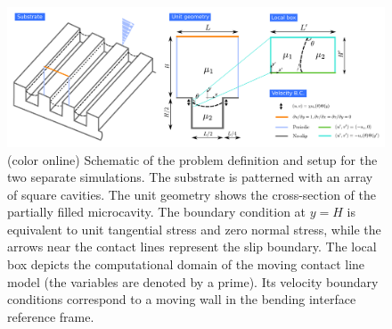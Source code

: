 \begin{figure}[t]
 \begin{center}
 \includegraphics[width=\columnwidth]{schematic5.pdf}
 \end{center}
 \caption{(color online) Schematic of the problem definition and setup for the two separate simulations. The substrate is patterned with an array of square cavities. The unit geometry shows the cross-section of the partially filled microcavity. The boundary condition at $y=H$ is equivalent to unit tangential stress and zero normal stress, while the arrows near the contact lines represent the slip boundary. The local box depicts the computational domain of the moving contact line model (the variables are denoted by a prime). Its velocity boundary conditions correspond to a moving wall in the bending interface reference frame.}
 \label{fig: schematic}
\end{figure}


